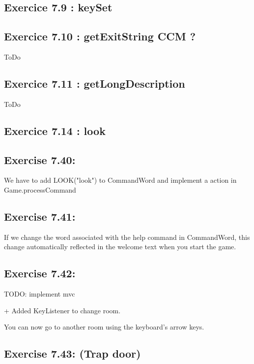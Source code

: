 \documentclass[twoside,french]{report}
\begin{document}
\subsection*{Exercice 7.9 : keySet}

\subsection*{Exercice 7.10 : getExitString CCM ?}

ToDo

\subsection*{Exercice 7.11 : getLongDescription}

ToDo

\subsection*{Exercice 7.14 :  look}






\subsection*{Exercise 7.40:}

We have to add LOOK("look") to CommandWord and implement a action in Game.processCommand

\subsection*{Exercise 7.41:}

If we change the word associated with the help command in CommandWord, this change automatically reflected in the welcome text when you start the game.

\subsection*{Exercise 7.42:}

TODO: implement mvc

+ Added KeyListener to change room.

You can now go to another room using the keyboard's arrow keys.

\subsection*{Exercise 7.43: (Trap door)}
\end{document}
